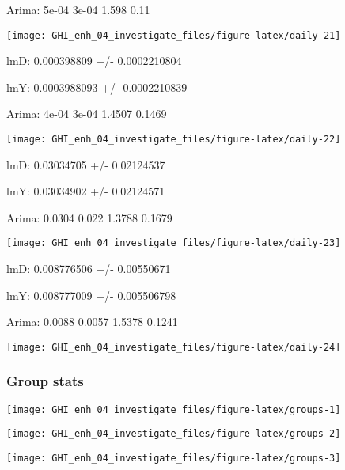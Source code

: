\documentclass[
  10pt,
  a4paper,oneside]{article}
\begin{document}
Arima: 5e-04 3e-04 1.598 0.11

\begin{center}\texttt{[image: GHI\_enh\_04\_investigate\_files/figure-latex/daily-21]} \end{center}

lmD: 0.000398809 +/- 0.0002210804

lmY: 0.0003988093 +/- 0.0002210839

Arima: 4e-04 3e-04 1.4507 0.1469

\begin{center}\texttt{[image: GHI\_enh\_04\_investigate\_files/figure-latex/daily-22]} \end{center}

lmD: 0.03034705 +/- 0.02124537

lmY: 0.03034902 +/- 0.02124571

Arima: 0.0304 0.022 1.3788 0.1679

\begin{center}\texttt{[image: GHI\_enh\_04\_investigate\_files/figure-latex/daily-23]} \end{center}

lmD: 0.008776506 +/- 0.00550671

lmY: 0.008777009 +/- 0.005506798

Arima: 0.0088 0.0057 1.5378 0.1241

\begin{center}\texttt{[image: GHI\_enh\_04\_investigate\_files/figure-latex/daily-24]} \end{center}

\newpage
\FloatBarrier

\hypertarget{group-stats}{%
\subsubsection{Group stats}\label{group-stats}}

\begin{center}\texttt{[image: GHI\_enh\_04\_investigate\_files/figure-latex/groups-1]} \end{center}

\begin{center}\texttt{[image: GHI\_enh\_04\_investigate\_files/figure-latex/groups-2]} \end{center}

\begin{center}\texttt{[image: GHI\_enh\_04\_investigate\_files/figure-latex/groups-3]} \end{center}
\end{document}
